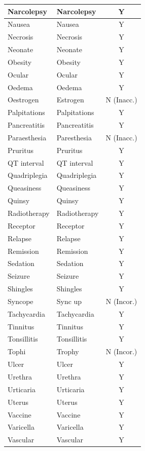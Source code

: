 \begin{table}[H]
\begin{minipage}[t]{0.48\textwidth}
\begin{tabular}{|l|l|c|}
Narcolepsy & Narcolepsy & Y \\ \hline
Nausea & Nausea & Y \\ \hline
Necrosis & Necrosis & Y \\ \hline
Neonate & Neonate & Y \\ \hline
Obesity & Obesity & Y \\ \hline
Ocular & Ocular & Y \\ \hline
Oedema & Oedema & Y \\ \hline
Oestrogen & Estrogen & N (Inacc.) \\ \hline
Palpitations & Palpitations & Y \\ \hline
Pancreatitis & Pancreatitis & Y \\ \hline
Paraesthesia & Paresthesia & N (Inacc.) \\ \hline
Pruritus & Pruritus & Y \\ \hline
QT interval & QT interval & Y \\ \hline
Quadriplegia & Quadriplegia & Y \\ \hline
Queasiness & Queasiness & Y \\ \hline
Quinsy & Quinsy & Y \\ \hline
Radiotherapy & Radiotherapy & Y \\ \hline
Receptor & Receptor & Y \\ \hline
Relapse & Relapse & Y \\ \hline
Remission & Remission & Y \\ \hline
Sedation & Sedation & Y \\ \hline
Seizure & Seizure & Y \\ \hline
Shingles & Shingles & Y \\ \hline
Syncope & Sync up & N (Incor.) \\ \hline
Tachycardia & Tachycardia & Y \\ \hline
Tinnitus & Tinnitus & Y \\ \hline
Tonsillitis & Tonsillitis & Y \\ \hline
Tophi & Trophy & N (Incor.) \\ \hline
Ulcer & Ulcer & Y \\ \hline
Urethra & Urethra & Y \\ \hline
Urticaria & Urticaria & Y \\ \hline
Uterus & Uterus & Y \\ \hline
Vaccine & Vaccine & Y \\ \hline
Varicella & Varicella & Y \\ \hline
Vascular & Vascular & Y \\ \hline

\end{tabular}
\end{minipage}
\end{table}
